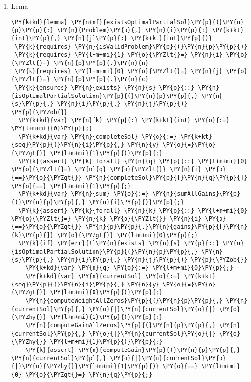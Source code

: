 \begin{sloppypar}
\begin{enumerate}
     \item Lema 
     \begin{Verbatim}[commandchars=\\\{\}]
\PY{k+kd}{lemma} \PY{n+nf}{existsOptimalPartialSol}\PY{p}{(}\PY{n}{p}\PY{p}{:} \PY{n}{Problem}\PY{p}{,} \PY{n}{i}\PY{p}{:} \PY{k+kt}{int}\PY{p}{,} \PY{n}{j}\PY{p}{:} \PY{k+kt}{int}\PY{p}{)} 
 \PY{k}{requires} \PY{n}{isValidProblem}\PY{p}{(}\PY{n}{p}\PY{p}{)}
 \PY{k}{requires} \PY{l+m+mi}{1} \PY{o}{\PYZlt{}=} \PY{n}{i} \PY{o}{\PYZlt{}=} \PY{n}{p}\PY{p}{.}\PY{n}{n}
 \PY{k}{requires} \PY{l+m+mi}{0} \PY{o}{\PYZlt{}=} \PY{n}{j} \PY{o}{\PYZlt{}=} \PY{n}{p}\PY{p}{.}\PY{n}{c}
 \PY{k}{ensures} \PY{n}{exists} \PY{n}{s} \PY{p}{::} \PY{n}{isOptimalPartialSolution}\PY{p}{(}\PY{n}{p}\PY{p}{,} \PY{n}{s}\PY{p}{,} \PY{n}{i}\PY{p}{,} \PY{n}{j}\PY{p}{)}
\PY{p}{\PYZob{}}
  \PY{k+kd}{var} \PY{n}{k} \PY{p}{:} \PY{k+kt}{int} \PY{o}{:=} \PY{l+m+mi}{0}\PY{p}{;}
  \PY{k+kd}{var} \PY{n}{completeSol} \PY{o}{:=} \PY{k+kt}{seq}\PY{p}{(}\PY{n}{i}\PY{p}{,} \PY{n}{y} \PY{o}{=}\PY{o}{\PYZgt{}} \PY{l+m+mi}{1}\PY{p}{)}\PY{p}{;}
  \PY{k}{assert} \PY{k}{forall} \PY{n}{q} \PY{p}{::} \PY{l+m+mi}{0} \PY{o}{\PYZlt{}=} \PY{n}{q} \PY{o}{\PYZlt{}} \PY{n}{i} \PY{o}{==}\PY{o}{\PYZgt{}} \PY{n}{completeSol}\PY{p}{[}\PY{n}{q}\PY{p}{]} \PY{o}{==} \PY{l+m+mi}{1}\PY{p}{;}
  \PY{k+kd}{var} \PY{n}{sum} \PY{o}{:=} \PY{n}{sumAllGains}\PY{p}{(}\PY{n}{p}\PY{p}{,} \PY{n}{i}\PY{p}{)}\PY{p}{;}
  \PY{k}{assert} \PY{k}{forall} \PY{n}{k} \PY{p}{::} \PY{l+m+mi}{0} \PY{o}{\PYZlt{}=} \PY{n}{k} \PY{o}{\PYZlt{}} \PY{n}{i} \PY{o}{==}\PY{o}{\PYZgt{}} \PY{n}{p}\PY{p}{.}\PY{n}{gains}\PY{p}{[}\PY{n}{k}\PY{p}{]} \PY{o}{\PYZgt{}} \PY{l+m+mi}{0}\PY{p}{;}
  \PY{k}{if} \PY{err}{!}\PY{n}{exists} \PY{n}{s} \PY{p}{::} \PY{n}{isOptimalPartialSolution}\PY{p}{(}\PY{n}{p}\PY{p}{,} \PY{n}{s}\PY{p}{,} \PY{n}{i}\PY{p}{,} \PY{n}{j}\PY{p}{)} \PY{p}{\PYZob{}}
    \PY{k+kd}{var} \PY{n}{q} \PY{o}{:=} \PY{l+m+mi}{0}\PY{p}{;} 
    \PY{k+kd}{var} \PY{n}{currentSol} \PY{o}{:=} \PY{k+kt}{seq}\PY{p}{(}\PY{n}{i}\PY{p}{,} \PY{n}{y} \PY{o}{=}\PY{o}{\PYZgt{}} \PY{l+m+mi}{0}\PY{p}{)}\PY{p}{;}
    \PY{n}{computeWeightAllZeros}\PY{p}{(}\PY{n}{p}\PY{p}{,} \PY{n}{currentSol}\PY{p}{,} \PY{o}{|}\PY{n}{currentSol}\PY{o}{|} \PY{o}{\PYZhy{}} \PY{l+m+mi}{1}\PY{p}{)}\PY{p}{;}
    \PY{n}{computeGainAllZeros}\PY{p}{(}\PY{n}{p}\PY{p}{,} \PY{n}{currentSol}\PY{p}{,} \PY{o}{|}\PY{n}{currentSol}\PY{o}{|} \PY{o}{\PYZhy{}} \PY{l+m+mi}{1}\PY{p}{)}\PY{p}{;}
    \PY{k}{assert} \PY{n}{computeGain}\PY{p}{(}\PY{n}{p}\PY{p}{,} \PY{n}{currentSol}\PY{p}{,} \PY{o}{|}\PY{n}{currentSol}\PY{o}{|}\PY{o}{\PYZhy{}}\PY{l+m+mi}{1}\PY{p}{)} \PY{o}{==} \PY{l+m+mi}{0} \PY{o}{\PYZgt{}=} \PY{n}{q}\PY{p}{;}

\end{Verbatim}
\end{enumerate}
\end{sloppypar}
